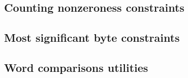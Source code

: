 \subsection{Counting nonzeroness constraints}                  \label{exp: general: conting nonzeroness}               
\subsection{Most significant byte constraints}                 \label{exp: general: most significant byte}             
\subsection{Word comparisons utilities}                        \label{exp: general: word comparison utilities}         


